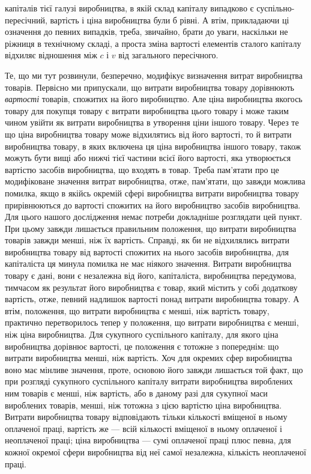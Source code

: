 \parcont{}  %
капіталів тієї галузі виробництва, в якій склад капіталу випадково є суспільно-пересічний, вартість
і ціна виробництва були б
рівні. А втім, прикладаючи ці означення до певних випадків,
треба, звичайно, брати до уваги, наскільки не ріжниця в технічному складі, а проста зміна вартості
елементів сталого капіталу
відхиляє відношення між $c$ і $v$ від загального пересічного.

Те, що ми тут розвинули, безперечно, модифікує визначення
витрат виробництва товарів. Первісно ми припускали, що витрати виробництва товару дорівнюють
\emph{вартості} товарів, спожитих на його виробництво. Але ціна виробництва якогось товару для покупця
товару є витрати виробництва цього товару
і може таким чином увійти як витрати виробництва в утворення
ціни іншого товару. Через те що ціна виробництва товару може
відхилятись від його вартості, то й витрати виробництва товару,
в яких включена ця ціна виробництва іншого товару, також
можуть бути вищі або нижчі тієї частини всієї його вартості,
яка утворюється вартістю засобів виробництва, що входять в
товар. Треба пам’ятати про це модифіковане значення витрат
виробництва, отже, пам’ятати, що завжди можлива помилка,
якщо в якійсь окремій сфері виробництва витрати виробництва товару прирівнюються до вартості
спожитих на його виробництво
засобів виробництва. Для цього нашого дослідження немає потреби докладніше розглядати цей пункт. При
цьому завжди лишається правильним положення, що витрати виробництва товарів
завжди менші, ніж їх вартість. Справді, як би не відхилялись
витрати виробництва товару від вартості спожитих на нього
засобів виробництва, для капіталіста ця минула помилка не має
ніякого значення. Витрати виробництва товару є дані, вони є
незалежна від його, капіталіста, виробництва передумова, тимчасом як результат його виробництва є
товар, який містить у
собі додаткову вартість, отже, певний надлишок вартості понад
витрати виробництва товару. А втім, положення, що витрати
виробництва є менші, ніж вартість товару, практично перетворилось тепер у положення, що витрати
виробництва є менші,
ніж ціна виробництва. Для сукупного суспільного капіталу, для
якого ціна виробництва дорівнює вартості, це положення є
тотожне з попереднім: що витрати виробництва менші, ніж вартість. Хоч для окремих сфер виробництва
воно має мінливе значення, проте, основою його завжди лишається той факт, що при розгляді сукупного
суспільного капіталу витрати виробництва
вироблених ним товарів є менші, ніж вартість, або в даному разі
для сукупної маси вироблених товарів, менші, ніж тотожна з цією
вартістю ціна виробництва. Витрати виробництва товару відповідають тільки кількості вміщеної в ньому
оплаченої праці,
вартість же — всій кількості вміщеної в ньому оплаченої і неоплаченої праці; ціна виробництва — сумі
оплаченої праці плюс
певна, для кожної окремої сфери виробництва від неї самої незалежна, кількість неоплаченої праці.
